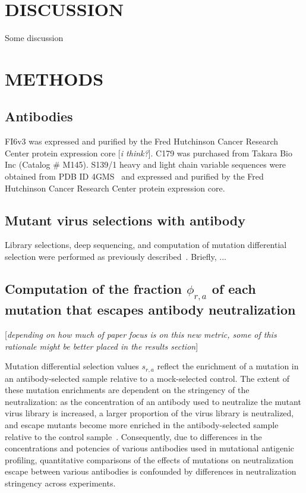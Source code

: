 \documentclass[11pt]{article}
\newcommand{\comment}[1]{{\color{red}[\textsl{#1}]}}
\begin{document}
\section*{DISCUSSION}
Some discussion

\clearpage

\section*{METHODS}
\subsection*{Antibodies}
FI6v3 was expressed and purified by the Fred Hutchinson Cancer Research Center protein expression core \comment{i think?}.
C179 was purchased from Takara Bio Inc (Catalog \# M145).
S139/1 heavy and light chain variable sequences were obtained from PDB ID 4GMS~\cite{lee2012heterosubtypic} and expressed and purified by the Fred Hutchinson Cancer Research Center protein expression core.

\subsection*{Mutant virus selections with antibody}
Library selections, deep sequencing, and computation of mutation differential selection were performed as previously described~\cite{doud2017complete}. Briefly, ...

\subsection*{Computation of the fraction $\phi_{r,a}$ of each mutation that escapes antibody neutralization}
\comment{depending on how much of paper focus is on this new metric, some of this rationale might be better placed in the results section}

Mutation differential selection values $s_{r,a}$ reflect the enrichment of a mutation in an antibody-selected sample relative to a mock-selected control. 
The extent of these mutation enrichments are dependent on the stringency of the neutralization: as the concentration of an antibody used to neutralize the mutant virus library is increased, a larger proportion of the virus library is neutralized, and escape mutants become more enriched in the antibody-selected sample relative to the control sample~\cite{doud2017complete}.
Consequently, due to differences in the concentrations and potencies of various antibodies used in mutational antigenic profiling, quantitative comparisons of the effects of mutations on neutralization escape between various antibodies is confounded by differences in neutralization stringency across experiments.
\end{document}

